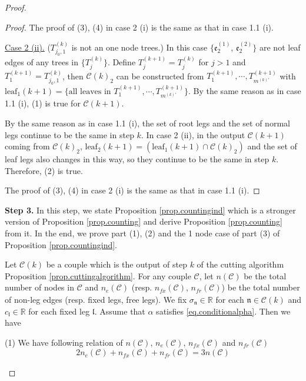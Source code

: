 \begin{proof}
\begin{proof}
The proof of (3), (4) in case 2 (i) is the same as that in case 1.1 (i).

\underline{Case 2 (ii).} ($T^{(k)}_{j_0,1}$ is not an one node trees.) In this case $\{\mathfrak{e}_{2}^{(1)}$, $\mathfrak{e}_{2}^{(2)}\}$ are not leaf edges of any trees in $\{T_{j}^{(k)}\}$. Define $T^{(k+1)}_{j}=T^{(k)}_{j}$ for $j>1$ and $T^{(k+1)}_{1}=T^{(k)}_{j_0,1}$, then $\mathcal{C}(k)_2$ can be constructed from $T^{(k+1)}_1, \cdots, T^{(k+1)}_{m^{(k)'}}$ with $\text{leaf}_1(k+1)=\{\text{all leaves in }T^{(k+1)}_1, \cdots, T^{(k+1)}_{m^{(k)'}}\}$. By the same reason as in case 1.1 (i), (1) is true for $\mathcal{C}(k+1)$.

By the same reason as in case 1.1 (i), the set of root legs and the set of normal legs continue to be the same in step $k$. In case 2 (ii), in the output $\mathcal{C}(k+1)$ coming from $\mathcal{C}(k)_2$, $\text{leaf}_2(k+1)=(\text{leaf}_1(k+1)\cap \mathcal{C}(k)_2)$ and the set of leaf legs also changes in this way, so they continue to be the same in step $k$. Therefore, (2) is true.

The proof of (3), (4) in case 2 (i) is the same as that in case 1.1 (i).
\end{proof}



\textbf{Step 3.} In this step, we state Proposition \ref{prop.countingind} which is a stronger version of Proposition \ref{prop.counting} and derive Proposition \ref{prop.counting} from it. In the end, we prove part (1), (2) and the 1 node case of part (3) of Proposition \ref{prop.countingind}.


\begin{prop}\label{prop.countingind}
Let $\mathcal{C}(k)$ be a couple which is the output of step $k$ of the cutting algorithm Proposition \ref{prop.cuttingalgorithm}. For any couple $\mathcal{C}$, let $n(\mathcal{C})$ be the total number of nodes in $\mathcal{C}$ and $n_e(\mathcal{C})$ (resp. $n_{fx}(\mathcal{C})$, $n_{\textit{fr}}(\mathcal{C})$) be the total number of non-leg edges (resp. fixed legs, free legs). We fix $\sigma_{\mathfrak{n}}\in\mathbb{R}$ for each $\mathfrak{n}\in \mathcal{C}(k)$ and $c_{\mathfrak{l}}\in \mathbb{R}$ for each fixed leg $\mathfrak{l}$. Assume that $\alpha$ satisfies \eqref{eq.conditionalpha}. Then we have

(1) We have following relation of $n(\mathcal{C})$, $n_e(\mathcal{C})$, $n_{fx}(\mathcal{C})$ and $n_{\textit{fr}}(\mathcal{C})$
\begin{equation}
    2n_e(\mathcal{C})+n_{fx}(\mathcal{C})+n_{\textit{fr}}(\mathcal{C})=3n(\mathcal{C})
\end{equation}


\end{prop}
\end{proof}
